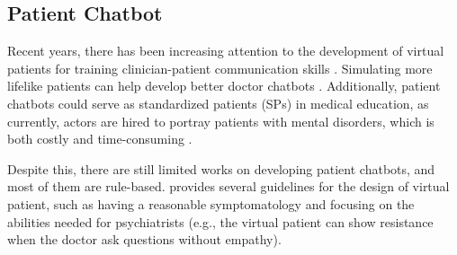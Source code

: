 \subsection{Patient Chatbot}
Recent years, there has been increasing attention to the development of virtual patients for training clinician-patient communication skills \cite{Chaby2022Embodied}. Simulating more lifelike patients can help develop better doctor chatbots \cite{tseng2021transferable}. Additionally, patient chatbots could serve as standardized patients (SPs) in medical education, as currently, actors are hired to portray patients with mental disorders, which is both costly and time-consuming \cite{Gillette2017Cost}. 

Despite this, there are still limited works on developing patient chatbots, and most of them are rule-based\cite{Llanos2021Lessons}. \citet{Duppuy2020Guidelines} provides several guidelines for the design of virtual patient, such as having a reasonable symptomatology and focusing on the abilities needed for psychiatrists (e.g., the virtual patient can show resistance when the doctor ask questions without empathy).


